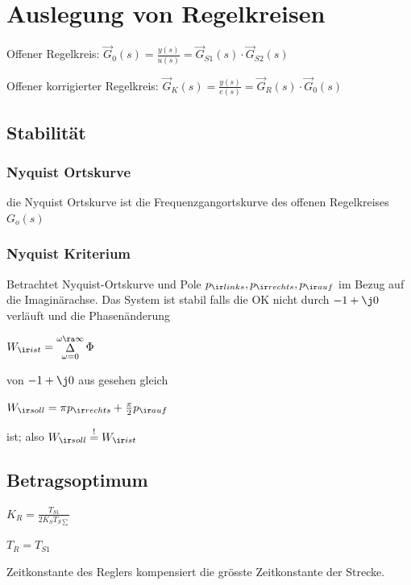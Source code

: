 \documentclass[german]{latex4ei_fs}
\begin{document}
\section{Auslegung von Regelkreisen}
\begin{sectionbox}
Offener Regelkreis: $\vec G_0 (s) = \frac{y(s)}{u(s)} = \vec G_{S1} (s) \cdot \vec G_{S2} (s)$

Offener korrigierter Regelkreis: $\vec G_K (s) = \frac{y(s)}{e(s)} = \vec G_R (s) \cdot \vec G_0 (s)$

\subsection{Stabilität}

\subsubsection{Nyquist Ortskurve}
	
	die Nyquist Ortskurve ist die Frequenzgangortskurve des offenen Regelkreises $G_o (s)$ 
	
	\subsubsection{Nyquist Kriterium}
	
	Betrachtet Nyquist-Ortskurve und Pole $p_{\ir links}, p_{\ir rechts}, p_{\ir auf}$ im Bezug auf die Imaginärachse.
	Das System ist stabil falls die OK nicht durch $-1 + \j 0$ verläuft und die Phasenänderung \\
	
	\begin{emphbox}
	$W_{\ir ist} = \mathop{\Delta}\limits_{\omega = 0}^{\omega \ra \infty} \Phi$
	\end{emphbox}
	
	von $-1 + \j 0$ aus gesehen gleich \\
	
		\begin{emphbox}
		$W_{\ir soll} = \pi p_{\ir rechts} + \frac{\pi}{2} p_{\ir auf}$
		\end{emphbox}
	ist; also $W_{\ir soll} \stackrel{!}{=} W_{\ir ist}$ 
\end{sectionbox}
\begin{sectionbox}
\subsection{Betragsoptimum}
$K_R = \frac{T_{S1}}{2 K_S T_{S \sum}}$

$T_R = T_{S1}$

Zeitkonstante des Reglers kompensiert die grösste Zeitkonstante der Strecke.

\end{sectionbox}
\end{document}

